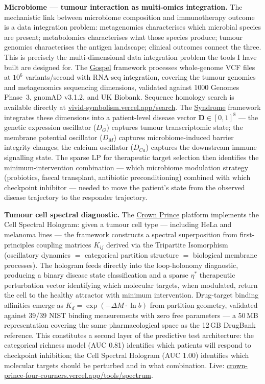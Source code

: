 \documentclass[12pt,a4paper]{article}
\begin{document}
\textbf{Microbiome --- tumour interaction as multi-omics integration.}
The mechanistic link between microbiome composition and immunotherapy outcome
is a data integration problem: metagenomics characterises which microbial species
are present; metabolomics characterises what those species produce;
tumour genomics characterises the antigen landscape; clinical outcomes connect
the three. This is precisely the multi-dimensional data integration problem
the tools I have built are designed for.
The \href{https://github.com/fullscreen-triangle/gospel}{Gospel} framework
processes whole-genome VCF files at $10^6$ variants/second with RNA-seq
integration, covering the tumour genomics and metagenomics sequencing dimensions,
validated against 1000 Genomes Phase~3, gnomAD v3.1.2, and UK Biobank.
Sequence homology search is available directly at
\href{https://vivid-symbolism.vercel.app/search}{vivid-symbolism.vercel.app/search}.
The \href{https://github.com/fullscreen-triangle/syndrome}{Syndrome} framework
integrates these dimensions into a patient-level disease vector
$\mathbf{D} \in [0,1]^8$ --- the genetic expression oscillator ($D_G$) captures
tumour transcriptomic state; the membrane potential oscillator ($D_M$) captures
microbiome-induced barrier integrity changes; the calcium oscillator ($D_{Ca}$)
captures the downstream immune signalling state. The sparse LP for therapeutic
target selection then identifies the minimum-intervention combination ---
which microbiome modulation strategy (probiotics, faecal transplant, antibiotic
preconditioning) combined with which checkpoint inhibitor --- needed to move the
patient's state from the observed disease trajectory to the responder trajectory.

\textbf{Tumour cell spectral diagnostic.}
The \href{https://crown-prince-four-courners.vercel.app}{Crown Prince} platform
implements the Cell Spectral Hologram: given a tumour cell type --- including HeLa
and melanoma lines --- the framework constructs a spectral superposition from
first-principles coupling matrices $K_{ij}$ derived via the Tripartite Isomorphism
(oscillatory dynamics $=$ categorical partition structure $=$ biological membrane
processes). The hologram feeds directly into the loop-holonomy diagnostic, producing
a binary disease state classification and a sparse $\eta^*$ therapeutic perturbation
vector identifying which molecular targets, when modulated, return the cell to the
healthy attractor with minimum intervention. Drug-target binding affinities emerge
as $K_d = \exp(-\Delta M \cdot \ln b)$ from partition geometry, validated against
39/39 NIST binding measurements with zero free parameters --- a 50\,MB representation
covering the same pharmacological space as the 12\,GB DrugBank reference.
This constitutes a second layer of the predictive test architecture: the categorical
richness model (AUC 0.81) identifies which patients will respond to checkpoint
inhibition; the Cell Spectral Hologram (AUC 1.00) identifies which molecular targets
should be perturbed and in what combination.
Live: \href{https://crown-prince-four-courners.vercel.app/tools/spectrum}{crown-prince-four-courners.vercel.app/tools/spectrum}.
\end{document}
